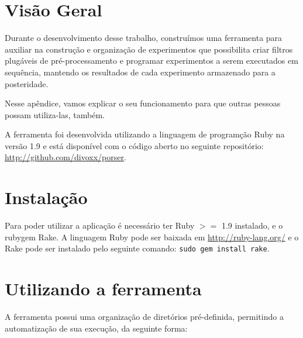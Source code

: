 \section{Visão Geral}

Durante o desenvolvimento desse trabalho, construímos uma ferramenta para auxiliar na construção e organização de experimentos que possibilita criar filtros plugáveis de pré-processamento e programar experimentos a serem executados em sequência, mantendo os resultados de cada experimento armazenado para a posteridade.

Nesse apêndice, vamos explicar o seu funcionamento para que outras pessoas possam utiliza-las, também.

A ferramenta foi desenvolvida utilizando a linguagem de programção Ruby na versão 1.9 e está disponível com o código aberto no seguinte repositório: \url{http://github.com/divoxx/porser}.

\section{Instalação}

Para poder utilizar a aplicação é necessário ter Ruby $>=$ 1.9 instalado, e o rubygem Rake. A linguagem Ruby pode ser baixada em \url{http://ruby-lang.org/} e o Rake pode ser instalado pelo seguinte comando: \verb|sudo gem install rake|.

\section{Utilizando a ferramenta}

A ferramenta possui uma organização de diretórios pré-definida, permitindo a automatização de sua execução, da seguinte forma:

